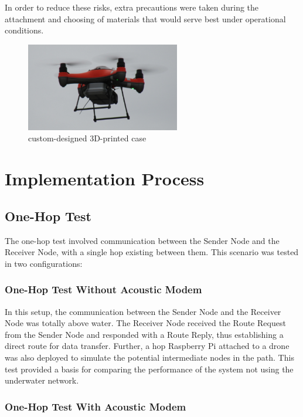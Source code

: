 \documentclass[]{nsm-thesis}
\begin{document}
In order to reduce these risks, extra precautions were taken during the attachment and choosing of materials that would serve best under operational conditions.
\begin{figure}[h!]
    \centering
    \includegraphics[width=0.6\textwidth]{image/Case_Drohne.png}
    \caption{custom-designed 3D-printed case}
    \label{fig:example7}
\end{figure}
\section{Implementation Process}
\subsection{One-Hop Test}
The one-hop test involved communication between the Sender Node and the Receiver Node, with a single hop existing between them. This scenario was tested in two configurations:
\subsubsection{One-Hop Test Without Acoustic Modem}
In this setup, the communication between the Sender Node and the Receiver Node was totally above water. The Receiver Node received the Route Request from the Sender Node and responded with a Route Reply, thus establishing a direct route for data transfer. Further, a hop Raspberry Pi attached to a drone was also deployed to simulate the potential intermediate nodes in the path. This test provided a basis for comparing the performance of the system not using the underwater network.
\subsubsection{One-Hop Test With Acoustic Modem}
\end{document}
